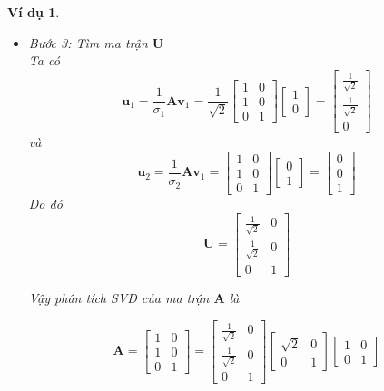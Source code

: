 \documentclass[12pt,a4paper,oneside]{report}
\newtheorem{vd}{Ví dụ} [section]
\numberwithin{equation}{section}
\begin{document}
\begin{vd}
\begin{itemize}
Từ đó suy ra

$$
\mathbf{V}^{T}=\left[\begin{array}{ll}
	1 & 0 \\
	0 & 1
\end{array}\right]
$$

\item Bước 3: Tìm ma trận $\mathbf{U}$\\
Ta có
$$
\mathbf{u}_{1}=\frac{1}{\sigma_{1}} \mathbf{A} \mathbf{v}_{1}=\frac{1}{\sqrt{2}}\left[\begin{array}{ll}
	1 & 0 \\
	1 & 0 \\
	0 & 1
\end{array}\right]\left[\begin{array}{l}
	1 \\
	0
\end{array}\right]=\left[\begin{array}{c}
	\frac{1}{\sqrt{2}} \\
	\frac{1}{\sqrt{2}} \\
	0
\end{array}\right]
$$
và
$$
\mathbf{u}_{2}=\frac{1}{\sigma_{2}} \mathbf{A} \mathbf{v}_{1}=\left[\begin{array}{ll}
	1 & 0 \\
	1 & 0 \\
	0 & 1
\end{array}\right]\left[\begin{array}{l}
	0 \\
	1
\end{array}\right]=\left[\begin{array}{l}
	0 \\
	0 \\
	1
\end{array}\right]
$$
Do đó
$$
\mathbf{U}=\left[\begin{array}{cc}
	\frac{1}{\sqrt{2}} & 0 \\
	\frac{1}{\sqrt{2}} & 0 \\
	0 & 1
\end{array}\right]
$$

Vậy phân tích SVD của ma trận $\mathbf{A}$ là

$$
\mathbf{A}=\left[\begin{array}{ll}
	1 & 0 \\
	1 & 0 \\
	0 & 1
\end{array}\right]=\left[\begin{array}{cc}
	\frac{1}{\sqrt{2}} & 0 \\
	\frac{1}{\sqrt{2}} & 0 \\
	0 & 1
\end{array}\right]\left[\begin{array}{cc}
	\sqrt{2} & 0 \\
	0 & 1
\end{array}\right]\left[\begin{array}{ll}
	1 & 0 \\
	0 & 1
\end{array}\right]
$$
\end{itemize}
\end{vd}
\end{document}
